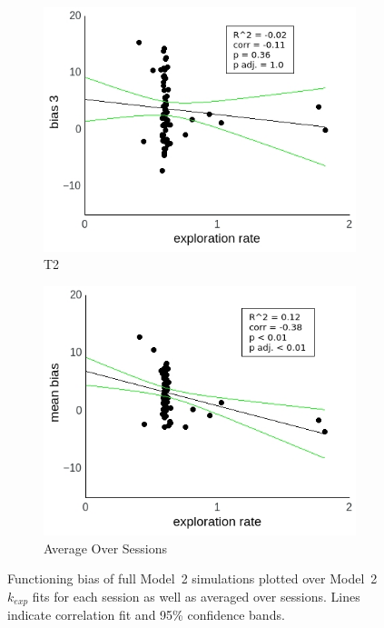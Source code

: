 \documentclass[a4paper]{scrreprt}
\begin{document}
\begin{figure}
\begin{subfigure}[b]{0.49\textwidth}
        \includegraphics[width=\textwidth]{figs/sec3/temp/temp_diff_3_mod2mod2.jpeg}
        \caption{T2}
    \end{subfigure}
    \begin{subfigure}[b]{0.49\textwidth}
        \includegraphics[width=\textwidth]{figs/sec3/temp/temp_diff_mean_mod2mod2.jpeg}
        \caption{Average Over Sessions}
    \end{subfigure}
\caption{Functioning bias of full Model~2 simulations plotted over Model~2 $k_{exp}$ fits for each session as well as averaged over sessions. Lines indicate correlation fit and 95\% confidence bands.}
\label{fig:temp_diff_mod2mod2}
\end{figure}
\end{document}
